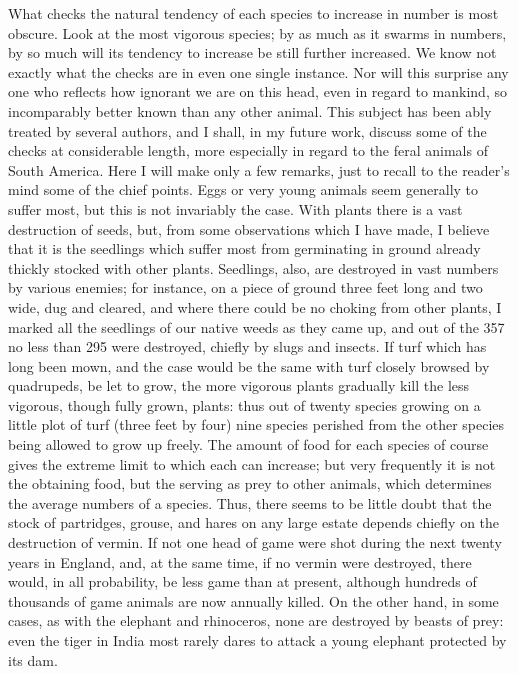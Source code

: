 What checks the natural tendency of each species to increase in number is most obscure. Look at the most vigorous species; by as much as it swarms in numbers, by so much will its tendency to increase be still further increased. We know not exactly what the checks are in even one single instance. Nor will this surprise any one who reflects how ignorant we are on this head, even in regard to mankind, so incomparably better known than any other animal. This subject has been ably treated by several authors, and I shall, in my future work, discuss some of the checks at considerable length, more especially in regard to the feral animals of South America. Here I will make only a few remarks, just to recall to the reader's mind some of the chief points. Eggs or very young animals seem generally to suffer most, but this is not invariably the case. With plants there is a vast destruction of seeds, but, from some observations which I have made, I believe that it is the seedlings which suffer most from germinating in ground already thickly stocked with other plants. Seedlings, also, are destroyed in vast numbers by various enemies; for instance, on a piece of ground three feet long and two wide, dug and cleared, and where there could be no choking from other plants, I marked all the seedlings of our native weeds as they came up, and out of the 357 no less than 295 were destroyed, chiefly by slugs and insects. If turf which has long been mown, and the case would be the same with turf closely browsed by quadrupeds, be let to grow, the more vigorous plants gradually kill the less vigorous, though fully grown, plants: thus out of twenty species growing on a little plot of turf (three feet by four) nine species perished from the other species being allowed to grow up freely.
The amount of food for each species of course gives the extreme limit to which each can increase; but very frequently it is not the obtaining food, but the serving as prey to other animals, which determines the average numbers of a species. Thus, there seems to be little doubt that the stock of partridges, grouse, and hares on any large estate depends chiefly on the destruction of vermin. If not one head of game were shot during the next twenty years in England, and, at the same time, if no vermin were destroyed, there would, in all probability, be less game than at present, although hundreds of thousands of game animals are now annually killed. On the other hand, in some cases, as with the elephant and rhinoceros, none are destroyed by beasts of prey: even the tiger in India most rarely dares to attack a young elephant protected by its dam.
